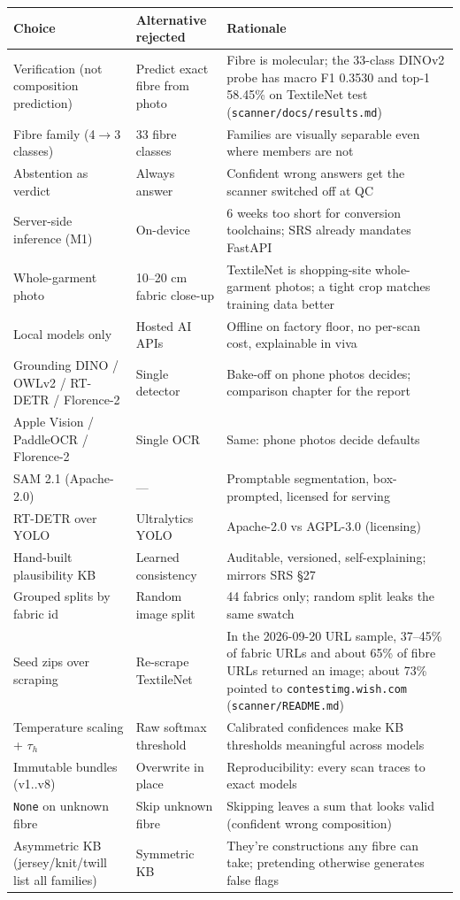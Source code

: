 \documentclass[11pt,a4paper]{article}
\begin{document}
\begin{table}[h]
\centering
\small
\begin{tabular}{p{4.2cm}p{4.2cm}p{5.4cm}}
\toprule
Choice & Alternative rejected & Rationale \\
\midrule
Verification (not composition prediction) & Predict exact fibre from photo & Fibre is molecular; the 33-class DINOv2 probe has macro F1 0.3530 and top-1 58.45\% on TextileNet test (\texttt{scanner/docs/results.md}) \\
Fibre family (4$\to$3 classes) & 33 fibre classes & Families are visually separable even where members are not \\
Abstention as verdict & Always answer & Confident wrong answers get the scanner switched off at QC \\
Server-side inference (M1) & On-device & 6 weeks too short for conversion toolchains; SRS already mandates FastAPI \\
Whole-garment photo & 10--20 cm fabric close-up & TextileNet is shopping-site whole-garment photos; a tight crop matches training data better \\
Local models only & Hosted AI APIs & Offline on factory floor, no per-scan cost, explainable in viva \\
Grounding DINO / OWLv2 / RT-DETR / Florence-2 & Single detector & Bake-off on phone photos decides; comparison chapter for the report \\
Apple Vision / PaddleOCR / Florence-2 & Single OCR & Same: phone photos decide defaults \\
SAM 2.1 (Apache-2.0) & --- & Promptable segmentation, box-prompted, licensed for serving \\
RT-DETR over YOLO & Ultralytics YOLO & Apache-2.0 vs AGPL-3.0 (licensing) \\
Hand-built plausibility KB & Learned consistency & Auditable, versioned, self-explaining; mirrors SRS \S 27 \\
Grouped splits by fabric id & Random image split & 44 fabrics only; random split leaks the same swatch \\
Seed zips over scraping & Re-scrape TextileNet & In the 2026-09-20 URL sample, 37--45\% of fabric URLs and about 65\% of fibre URLs returned an image; about 73\% pointed to \texttt{contestimg.wish.com} (\texttt{scanner/README.md}) \\
Temperature scaling + $\tau_h$ & Raw softmax threshold & Calibrated confidences make KB thresholds meaningful across models \\
Immutable bundles (v1..v8) & Overwrite in place & Reproducibility: every scan traces to exact models \\
\texttt{None} on unknown fibre & Skip unknown fibre & Skipping leaves a sum that looks valid (confident wrong composition) \\
Asymmetric KB (jersey/knit/twill list all families) & Symmetric KB & They're constructions any fibre can take; pretending otherwise generates false flags \\
\bottomrule
\end{tabular}
\end{table}
\end{document}
